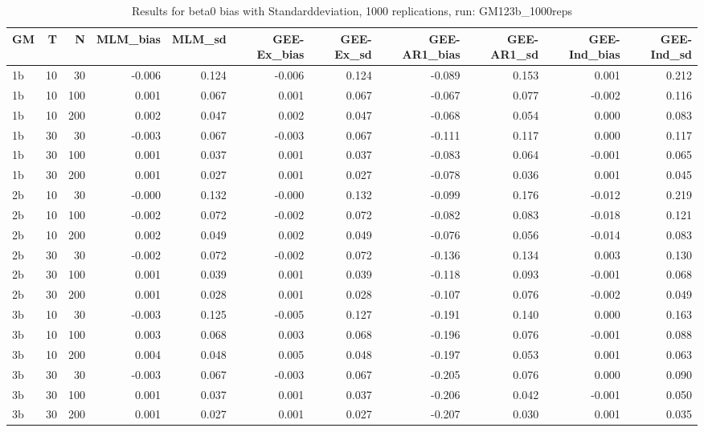 \begin{table}[ht]
\centering
\begin{tabular}{lrrrrrrrrrr}
  \hline
GM & T & N & MLM\_bias & MLM\_sd & GEE-Ex\_bias & GEE-Ex\_sd & GEE-AR1\_bias & GEE-AR1\_sd & GEE-Ind\_bias & GEE-Ind\_sd \\ 
  \hline
1b & 10 & 30 & -0.006 & 0.124 & -0.006 & 0.124 & -0.089 & 0.153 & 0.001 & 0.212 \\ 
  1b & 10 & 100 & 0.001 & 0.067 & 0.001 & 0.067 & -0.067 & 0.077 & -0.002 & 0.116 \\ 
  1b & 10 & 200 & 0.002 & 0.047 & 0.002 & 0.047 & -0.068 & 0.054 & 0.000 & 0.083 \\ 
  1b & 30 & 30 & -0.003 & 0.067 & -0.003 & 0.067 & -0.111 & 0.117 & 0.000 & 0.117 \\ 
  1b & 30 & 100 & 0.001 & 0.037 & 0.001 & 0.037 & -0.083 & 0.064 & -0.001 & 0.065 \\ 
  1b & 30 & 200 & 0.001 & 0.027 & 0.001 & 0.027 & -0.078 & 0.036 & 0.001 & 0.045 \\ 
   \hline
2b & 10 & 30 & -0.000 & 0.132 & -0.000 & 0.132 & -0.099 & 0.176 & -0.012 & 0.219 \\ 
  2b & 10 & 100 & -0.002 & 0.072 & -0.002 & 0.072 & -0.082 & 0.083 & -0.018 & 0.121 \\ 
  2b & 10 & 200 & 0.002 & 0.049 & 0.002 & 0.049 & -0.076 & 0.056 & -0.014 & 0.083 \\ 
  2b & 30 & 30 & -0.002 & 0.072 & -0.002 & 0.072 & -0.136 & 0.134 & 0.003 & 0.130 \\ 
  2b & 30 & 100 & 0.001 & 0.039 & 0.001 & 0.039 & -0.118 & 0.093 & -0.001 & 0.068 \\ 
  2b & 30 & 200 & 0.001 & 0.028 & 0.001 & 0.028 & -0.107 & 0.076 & -0.002 & 0.049 \\ 
   \hline
3b & 10 & 30 & -0.003 & 0.125 & -0.005 & 0.127 & -0.191 & 0.140 & 0.000 & 0.163 \\ 
  3b & 10 & 100 & 0.003 & 0.068 & 0.003 & 0.068 & -0.196 & 0.076 & -0.001 & 0.088 \\ 
  3b & 10 & 200 & 0.004 & 0.048 & 0.005 & 0.048 & -0.197 & 0.053 & 0.001 & 0.063 \\ 
  3b & 30 & 30 & -0.003 & 0.067 & -0.003 & 0.067 & -0.205 & 0.076 & 0.000 & 0.090 \\ 
  3b & 30 & 100 & 0.001 & 0.037 & 0.001 & 0.037 & -0.206 & 0.042 & -0.001 & 0.050 \\ 
  3b & 30 & 200 & 0.001 & 0.027 & 0.001 & 0.027 & -0.207 & 0.030 & 0.001 & 0.035 \\ 
   \hline
\end{tabular}
\caption{Results for beta0 bias with Standarddeviation, 1000 replications, run: GM123b_1000reps} 
\label{tab:beta0_bias_sd}
\end{table}
